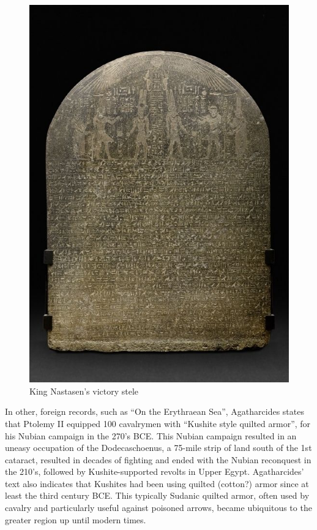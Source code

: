 \documentclass[a4paper,12pt]{scrreprt}
\begin{document}
\begin{figure}[H]
	\centering
	\includegraphics[width=\textwidth]{img/king_nastasen_stele}
	\caption{King Nastasen's victory stele}
\end{figure}

In other, foreign records, such as “On the Erythraean Sea”, Agatharcides states that Ptolemy II equipped 100 cavalrymen with “Kushite style quilted armor”, for his Nubian campaign in the 270’s BCE. This Nubian campaign resulted in an uneasy occupation of the Dodecaschoenus, a 75-mile strip of land south of the 1st cataract, resulted in decades of fighting and ended with the Nubian reconquest in the 210’s, followed by Kushite-supported revolts in Upper Egypt. Agatharcides’ text also indicates that Kushites had been using quilted (cotton?) armor since at least the third century BCE. This typically Sudanic quilted armor, often used by cavalry and particularly useful against poisoned arrows, became ubiquitous to the greater region up until modern times.
 
\end{document}
